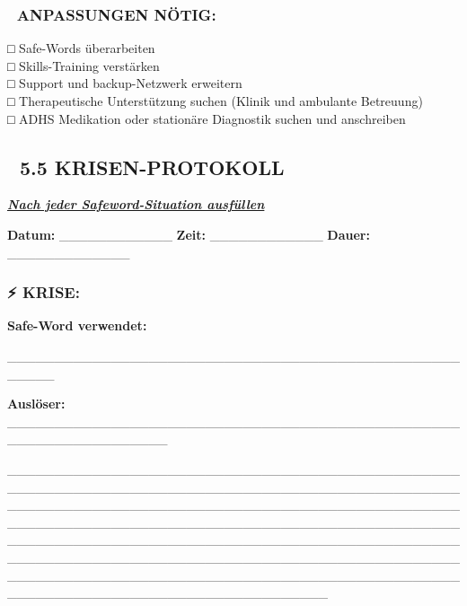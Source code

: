 \hypertarget{anpassungen-nuxf6tig}{%
\subsubsection{\texorpdfstring{\textbf{🔧 ANPASSUNGEN NÖTIG:}}{🔧 ANPASSUNGEN NÖTIG:}}\label{anpassungen-nuxf6tig}}

□ Safe-Words überarbeiten\\
□ Skills-Training verstärken\\
□ Support und backup-Netzwerk erweitern\\
□ Therapeutische Unterstützung suchen (Klinik und ambulante Betreuung)\\
□ ADHS Medikation oder stationäre Diagnostik suchen und anschreiben

\hypertarget{krisen-protokoll}{%
\subsection{\texorpdfstring{🚨 \textbf{5.5 KRISEN-PROTOKOLL}}{🚨 5.5 KRISEN-PROTOKOLL}}\label{krisen-protokoll}}

\emph{\textbf{\ul{Nach jeder Safeword-Situation ausfüllen}}}

\textbf{Datum:} \_\_\_\_\_\_\_\_\_\_\_\_ \textbf{Zeit:} \_\_\_\_\_\_\_\_\_\_\_\_ \textbf{Dauer:} \_\_\_\_\_\_\_\_\_\_\_\_\_

\hypertarget{krise}{%
\subsubsection{\texorpdfstring{\textbf{⚡ KRISE:}}{⚡ KRISE:}}\label{krise}}

\textbf{Safe-Word verwendet:}

\_\_\_\_\_\_\_\_\_\_\_\_\_\_\_\_\_\_\_\_\_\_\_\_\_\_\_\_\_\_\_\_\_\_\_\_\_\_\_\_\_\_\_\_\_\_\_\_\_\_\_\_\_

\textbf{Auslöser:} \_\_\_\_\_\_\_\_\_\_\_\_\_\_\_\_\_\_\_\_\_\_\_\_\_\_\_\_\_\_\_\_\_\_\_\_\_\_\_\_\_\_\_\_\_\_\_\_\_\_\_\_\_\_\_\_\_\_\_\_\_\_\_\_\_

\_\_\_\_\_\_\_\_\_\_\_\_\_\_\_\_\_\_\_\_\_\_\_\_\_\_\_\_\_\_\_\_\_\_\_\_\_\_\_\_\_\_\_\_\_\_\_\_\_\_\_\_\_\_\_\_\_\_\_\_\_\_\_\_\_\_\_\_\_\_\_\_\_\_\_\_\_\_\_\_\_\_\_\_\_\_\_\_\_\_\_\_\_\_\_\_\_\_\_\_\_\_\_\_\_\_\_\_\_\_\_\_\_\_\_\_\_\_\_\_\_\_\_\_\_\_\_\_\_\_\_\_\_\_\_\_\_\_\_\_\_\_\_\_\_\_\_\_\_\_\_\_\_\_\_\_\_\_\_\_\_\_\_\_\_\_\_\_\_\_\_\_\_\_\_\_\_\_\_\_\_\_\_\_\_\_\_\_\_\_\_\_\_\_\_\_\_\_\_\_\_\_\_\_\_\_\_\_\_\_\_\_\_\_\_\_\_\_\_\_\_\_\_\_\_\_\_\_\_\_\_\_\_\_\_\_\_\_\_\_\_\_\_\_\_\_\_\_\_\_\_\_\_\_\_\_\_\_\_\_\_\_\_\_\_\_\_\_\_\_\_\_\_\_\_\_\_\_\_\_\_\_\_\_\_\_\_\_\_\_\_\_\_\_\_\_\_\_\_\_\_\_\_\_\_\_\_\_\_\_\_\_\_\_\_\_\_\_\_\_\_\_\_\_\_\_\_\_\_\_\_\_\_\_\_\_\_\_\_\_\_\_\_\_\_\_\_\_\_\_\_\_\_\_\_\_\_\_\_\_\_\_\_\_\_\_\_\_\_\_

